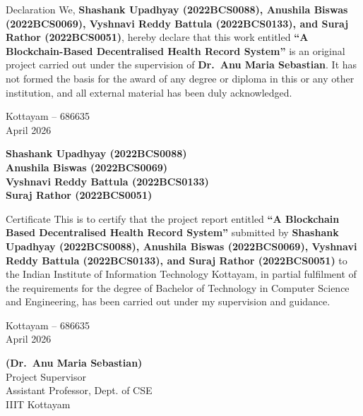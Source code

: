 \documentclass[10pt]{beamer}
\begin{document}
\begin{frame}{Declaration}
\footnotesize
\noindent We, \textbf{Shashank Upadhyay (2022BCS0088), Anushila Biswas (2022BCS0069), Vyshnavi Reddy Battula (2022BCS0133), and Suraj Rathor (2022BCS0051)}, hereby declare that this work entitled \textbf{``A Blockchain-Based Decentralised Health Record System''} is an original project carried out under the supervision of \textbf{Dr.\ Anu Maria Sebastian}. It has not formed the basis for the award of any degree or diploma in this or any other institution, and all external material has been duly acknowledged.

\vspace{0.6cm}
\noindent
\begin{minipage}[t]{0.47\textwidth}
Kottayam -- 686635\\
April 2026
\end{minipage}
\hfill
\begin{minipage}[t]{0.47\textwidth}
\raggedleft
\textbf{Shashank Upadhyay (2022BCS0088)}\\
\textbf{Anushila Biswas (2022BCS0069)}\\
\textbf{Vyshnavi Reddy Battula (2022BCS0133)}\\
\textbf{Suraj Rathor (2022BCS0051)}
\end{minipage}
\end{frame}

\begin{frame}{Certificate}
\footnotesize
\noindent This is to certify that the project report entitled \textbf{``A Blockchain Based Decentralised Health Record System''} submitted by \textbf{Shashank Upadhyay (2022BCS0088), Anushila Biswas (2022BCS0069), Vyshnavi Reddy Battula (2022BCS0133), and Suraj Rathor (2022BCS0051)} to the Indian Institute of Information Technology Kottayam, in partial fulfilment of the requirements for the degree of Bachelor of Technology in Computer Science and Engineering, has been carried out under my supervision and guidance.

\vspace{0.9cm}
\noindent
\begin{minipage}[t]{0.47\textwidth}
Kottayam -- 686635\\
April 2026
\end{minipage}
\hfill
\begin{minipage}[t]{0.47\textwidth}
\raggedleft
\textbf{(Dr.\ Anu Maria Sebastian)}\\
Project Supervisor\\
Assistant Professor, Dept. of CSE\\
IIIT Kottayam
\end{minipage}
\end{frame}
\end{document}
